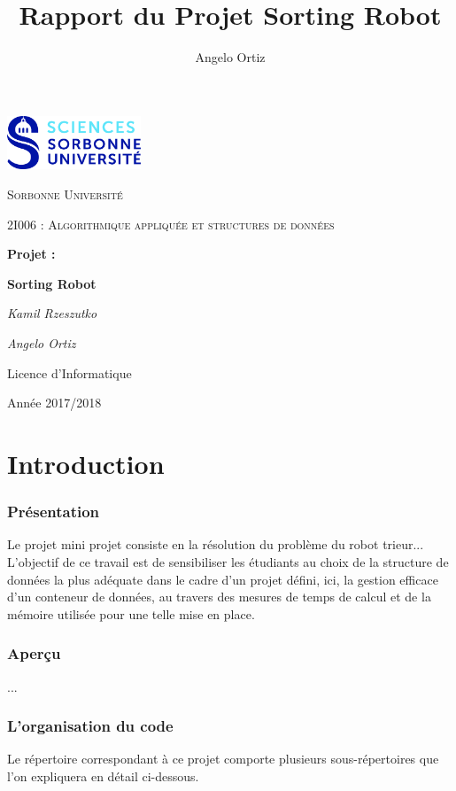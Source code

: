 \documentclass[12pt,a4paper]{article}
\author{Angelo Ortiz}
\title{Rapport du Projet Sorting Robot}
\begin{document}
\begin{titlepage}
  \centering
  \includegraphics[width=0.30\textwidth]{logo.jpg}\par\vspace{1cm}
  {\scshape\LARGE Sorbonne Universit\'e\par}
  \vspace{1cm}
  {\scshape\Large 2I006 : Algorithmique appliqu\'ee et structures de 
donn\'ees\par}
  \vspace{1.5cm}
  {\Large \bfseries Projet :\par}
  {\huge\bfseries Sorting Robot\par}
  \vspace{2cm}
  {\Large\itshape Kamil Rzeszutko\par}
  {\Large\itshape Angelo Ortiz\par}
  \vfill
  
  {\large Licence d'Informatique\par}
  {\large Ann\'ee 2017/2018\par}
\end{titlepage}
 
\tableofcontents
  
\newpage
  
\part*{Introduction}
\section*{Pr\'esentation}
Le projet mini projet consiste en la r\'esolution du probl\`eme du robot 
trieur...
L’objectif de ce travail est de sensibiliser les étudiants au choix de la structure de données la plus adéquate dans le cadre d’un projet défini, ici, la gestion efficace d’un conteneur de données, au travers des mesures de temps de calcul et de la mémoire utilisée pour une telle mise en place.
\section*{Aper\c{c}u}
...
\section*{L'organisation du code}
Le r\'epertoire correspondant \`a ce projet comporte plusieurs 
sous-r\'epertoires que l'on expliquera en d\'etail ci-dessous.
\end{document}
